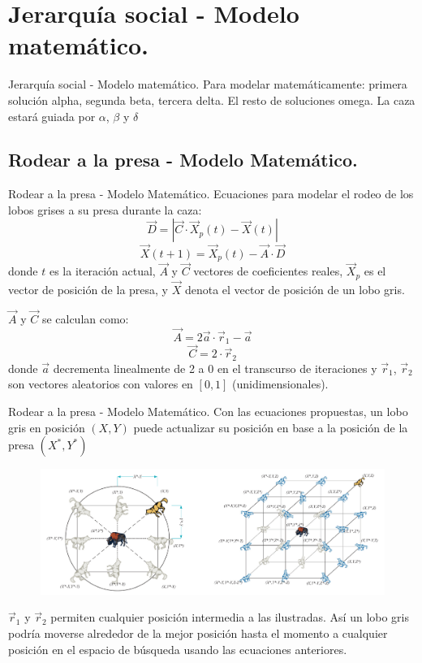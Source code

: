 \documentclass[a4paper,11pt]{beamer}
\begin{document}
\section{Jerarquía social - Modelo matemático.}

\begin{frame}{Jerarquía social - Modelo matemático.}
    Para modelar matemáticamente: primera solución alpha, segunda beta, tercera delta. El resto de soluciones omega. La caza estará guiada por $\alpha$, $\beta$ y $\delta$
    
\end{frame}

\subsection{Rodear a la presa - Modelo Matemático.}

\begin{frame}{Rodear a la presa - Modelo Matemático.}
    Ecuaciones para modelar el rodeo de los lobos grises a su presa durante la caza:
    $$\vec{D} = |\vec{C} \cdot \vec{X}_p(t)-\vec{X}(t)|$$
	$$\vec{X}(t+1)=\vec{X}_p(t)-\vec{A}\cdot \vec{D}$$
	donde $t$ es la iteración actual, $\vec{A}$ y $\vec{C}$ vectores de coeficientes reales, $\vec{X}_p$  es el vector de posición de la presa, y $\vec{X}$ denota el vector de posición de un lobo gris.
	
	$\vec{A}$ y $\vec{C}$ se calculan como:
	$$\vec{A}=2\vec{a}\cdot \vec{r}_1 -\vec{a}$$
	$$\vec{C}=2\cdot \vec{r}_2$$
	donde $\vec{a}$ decrementa linealmente de 2 a 0 en el transcurso de iteraciones y $\vec{r}_1$, $\vec{r}_2$ son vectores aleatorios con valores en $[0,1]$ (unidimensionales). 

\end{frame}

\begin{frame}{Rodear a la presa - Modelo Matemático.}
	Con las ecuaciones propuestas, un lobo gris en posición $(X,Y)$ puede actualizar su posición en base a la posición de la presa $(X^*, Y^*)$
    \begin{figure}[H]
		\centering
		\includegraphics[width=1\textwidth]{images/2d_3d.png}
	\end{figure} 
	$\vec{r}_1$ y $\vec{r}_2$ permiten cualquier posición intermedia a las ilustradas. Así un lobo gris podría moverse alrededor de la mejor posición hasta el momento a cualquier posición en el espacio de búsqueda usando las ecuaciones anteriores.

\end{frame}
\end{document}
